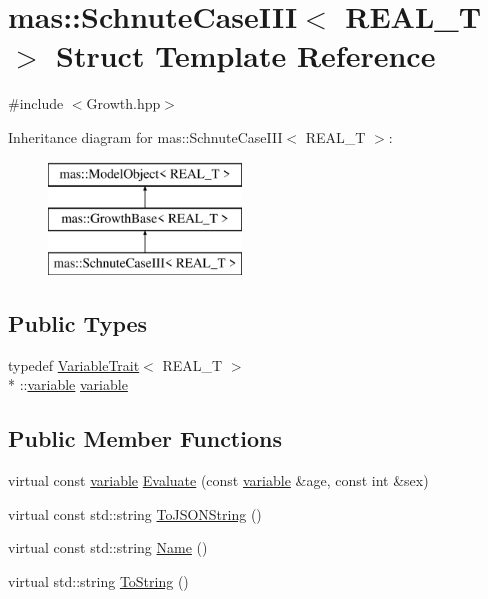 \hypertarget{structmas_1_1_schnute_case_i_i_i}{\section{mas\-:\-:Schnute\-Case\-I\-I\-I$<$ R\-E\-A\-L\-\_\-\-T $>$ Struct Template Reference}
\label{structmas_1_1_schnute_case_i_i_i}
}


{\ttfamily \#include $<$Growth.\-hpp$>$}

Inheritance diagram for mas\-:\-:Schnute\-Case\-I\-I\-I$<$ R\-E\-A\-L\-\_\-\-T $>$\-:\begin{figure}[H]
\begin{center}
\leavevmode
\includegraphics[height=3.000000cm]{structmas_1_1_schnute_case_i_i_i}
\end{center}
\end{figure}
\subsection*{Public Types}
\begin{DoxyCompactItemize}
\item 
typedef \hyperlink{structmas_1_1_variable_trait}{Variable\-Trait}$<$ R\-E\-A\-L\-\_\-\-T $>$\\*
\-::\hyperlink{structmas_1_1_schnute_case_i_i_i_a47b89c3219bc40a67dcb3dd626a585fa}{variable} \hyperlink{structmas_1_1_schnute_case_i_i_i_a47b89c3219bc40a67dcb3dd626a585fa}{variable}
\end{DoxyCompactItemize}
\subsection*{Public Member Functions}
\begin{DoxyCompactItemize}
\item 
virtual const \hyperlink{structmas_1_1_schnute_case_i_i_i_a47b89c3219bc40a67dcb3dd626a585fa}{variable} \hyperlink{structmas_1_1_schnute_case_i_i_i_a36829dacc125f07c7c9595f1e8ca0d8a}{Evaluate} (const \hyperlink{structmas_1_1_schnute_case_i_i_i_a47b89c3219bc40a67dcb3dd626a585fa}{variable} \&age, const int \&sex)
\item 
virtual const std\-::string \hyperlink{structmas_1_1_schnute_case_i_i_i_a7f55a0a6f9f4f8f577c952ec974c89c4}{To\-J\-S\-O\-N\-String} ()
\item 
virtual const std\-::string \hyperlink{structmas_1_1_schnute_case_i_i_i_a0b7e35620fbbdc033702c304054aa9e3}{Name} ()
\item 
virtual std\-::string \hyperlink{structmas_1_1_schnute_case_i_i_i_af99d1855589bc44641952cfc89d11a72}{To\-String} ()
\end{DoxyCompactItemize}
